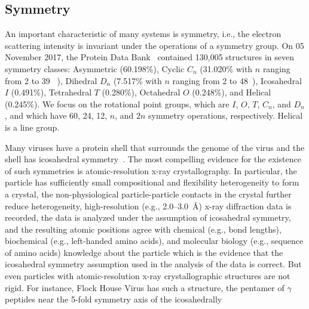 \subsection{Symmetry}
\label{sec:introduction:symmetry}
An important characteristic of many systems is symmetry, i.e.,
the electron scattering intensity is invariant under the operations of a
symmetry group.
On 05 November 2017, the Protein Data Bank~\cite{proteindatabank} contained
130,005 structures in seven symmetry classes:
Asymmetric (60.198\%),
Cyclic $C_n$ (31.020\% with $n$ ranging from 2 to 39~\cite{CasanasQuerolAudiGuerraPousTanakaTsukiharaVerdaguerFitaVaultParticleC39ActaCrystD2013,TanakaKatoYamashitaSumizawaZhouYaoIwasakiYoshimuraTsukiharaVaultParticleC39Science2009}
),
Dihedral $D_n$ (7.517\% with $n$ ranging from 2 to 48~\cite{AndersonKickhoeferSieversRomeEisenbergVaultShell9AngstromD48PLoSBiol2007}),
Icosahedral $I$ (0.491\%),
Tetrahedral $T$ (0.280\%),
Octahedral $O$ (0.248\%),
and Helical (0.245\%).
We focus on the rotational point groups, which are $I$, $O$, $T$, $C_n$,
and $D_n$, and which have 60, 24, 12, $n$, and $2n$ symmetry operations,
respectively.
Helical is a line group.
%
%
\par
Many viruses have a protein shell that surrounds
the genome of the virus and the shell has icosahedral
symmetry~\cite{RossmannJohnsonIcosahedralVirusAnnualReviewBiochem1989}.
The most compelling evidence for the existence of such symmetries is
atomic-resolution x-ray crystallography.
In particular,
the particle has sufficiently small compositional and flexibility
heterogeneity to form a crystal, the non-physiological particle-particle
contacts in the crystal further reduce heterogeneity, high-resolution
(e.g., 2.0--3.0~{\AA}) x-ray diffraction data is recorded, the data is
analyzed under the assumption of icosahedral symmetry, and the resulting
atomic positions agree with chemical (e.g., bond lengths), biochemical
(e.g., left-handed amino acids), and molecular biology (e.g., sequence of
amino acids) knowledge about the particle which is the evidence that the
icosahedral symmetry assumption used in the analysis of the data is
correct.
But even particles with atomic-resolution x-ray crystallographic structures
are not rigid.
For instance, Flock House Virus has such a structure, the pentamer of
$\gamma$ peptides near the 5-fold symmetry axis of the icosahedrally
